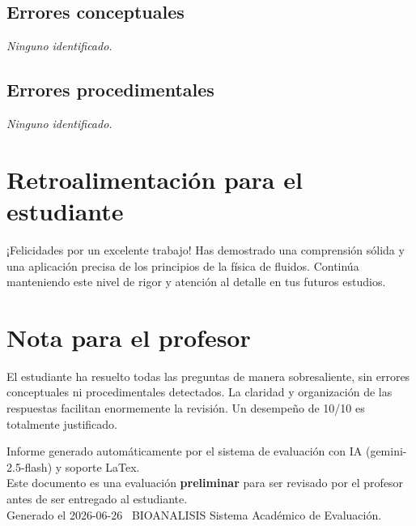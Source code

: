 \documentclass[11pt,a4paper]{article}
\begin{document}
\subsection*{Errores conceptuales}
\textit{Ninguno identificado.}

\subsection*{Errores procedimentales}
\textit{Ninguno identificado.}

\section*{Retroalimentación para el estudiante}
\begin{tcolorbox}[cajaRecomendacion, title={Dirigido a: luisielis marin 33627901}]
¡Felicidades por un excelente trabajo! Has demostrado una comprensión sólida y una aplicación precisa de los principios de la física de fluidos. Continúa manteniendo este nivel de rigor y atención al detalle en tus futuros estudios.
\end{tcolorbox}

\section*{Nota para el profesor}
\begin{tcolorbox}[
  enhanced, breakable,
  colback=yellow!8, colframe=yellow!60!black,
  fonttitle=\bfseries, coltitle=black,
  title={Observaciones para revisión manual},
  top=4pt, bottom=4pt, left=8pt, right=8pt,
]
El estudiante ha resuelto todas las preguntas de manera sobresaliente, sin errores conceptuales ni procedimentales detectados. La claridad y organización de las respuestas facilitan enormemente la revisión. Un desempeño de 10/10 es totalmente justificado.
\end{tcolorbox}

\vspace{12pt}
\begin{center}
  \footnotesize\color{gray}
  Informe generado automáticamente por el sistema de evaluación con IA (gemini-2.5-flash) y soporte LaTex. \\
  Este documento es una evaluación \textbf{preliminar} para ser revisado por el profesor antes de ser entregado al 
  estudiante. \\
  Generado el 2026-06-26 \textbullet\ BIOANALISIS Sistema Académico de Evaluación.
  \end{center}
\end{document}
